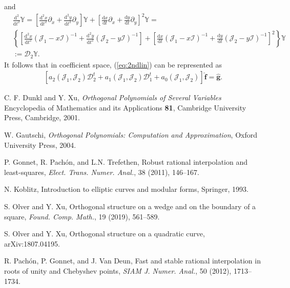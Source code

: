 \documentclass{amsart}
\theoremstyle{remark}
\begin{document}
and
\begin{align*}
&\frac{\mathrm{d}^2}{\mathrm{d}t^2}\mathbb{Y} = \left[\frac{\mathrm{d}^2x}{\mathrm{d}t^2} \partial_x  + \frac{\mathrm{d}^2y}{\mathrm{d}t^2} \partial_y\right] \mathbb{Y} + \left[\frac{\mathrm{d}x}{\mathrm{d}t} \partial_x  + \frac{\mathrm{d}y}{\mathrm{d}t} \partial_y\right]^2 \mathbb{Y} = \\
&\left\lbrace\left[\frac{\mathrm{d}^2x}{\mathrm{d}t^2} \left( \mathcal{J}_1 - x\mathcal{I}  \right)^{-1}  + \frac{\mathrm{d}^2y}{\mathrm{d}t^2}\left( \mathcal{J}_2 - y\mathcal{I}  \right)^{-1}\right] + \left[\frac{\mathrm{d}x}{\mathrm{d}t} \left( \mathcal{J}_1 - x\mathcal{I}  \right)^{-1}  + \frac{\mathrm{d}y}{\mathrm{d}t}\left( \mathcal{J}_2 - y\mathcal{I}  \right)^{-1}\right]^2\right \rbrace\mathbb{Y} \\
&:=\mathcal{D}_2\mathbb{Y}.
\end{align*}
It follows that in coefficient space, (\ref{eq:2ndlin}) can be represented as
\begin{align*}
\left[a_2(\mathcal{J}_1,\mathcal{J}_2)\mathcal{D}_2^{t} + a_1(\mathcal{J}_1,\mathcal{J}_2)\mathcal{D}_1^{t} + a_0(\mathcal{J}_1,\mathcal{J}_2)\right]\widehat{\mathbf{f}} = \widehat{\mathbf{g}}.
\end{align*}







\begin{thebibliography}{99}

        C. F. Dunkl and Y. Xu,
        \textit{Orthogonal Polynomials of Several Variables}
        Encyclopedia of Mathematics and its Applications \textbf{81},
         Cambridge University Press, Cambridge, 2001.
         
        W. Gautschi,
  \textit{Orthogonal Polynomials: Computation and Approximation},
  Oxford University Press, 2004.
  
  P. Gonnet, R. Pach\'on, and L.N. Trefethen,
  Robust rational interpolation and least-squares,
  \textit{Elect. Trans. Numer. Anal.},
  38 (2011), 146--167.
   
          N. Koblitz, 
          Introduction to elliptic curves and modular forms, 
          Springer, 1993.         

       S. Olver and Y. Xu,
       Orthogonal structure on a wedge and on the boundary of a square, 
       \textit{Found. Comp. Math.}, 19 (2019), 561--589.

       S. Olver and Y. Xu,
       Orthogonal structure on a quadratic curve, 
       arXiv:1807.04195.
       
R. Pach\'on, P. Gonnet, and J. Van Deun,
Fast and stable rational interpolation in roots of unity and Chebyshev points,
\textit{SIAM J. Numer. Anal.},
50 (2012), 1713--1734.
       
\end{thebibliography}
\end{document}
